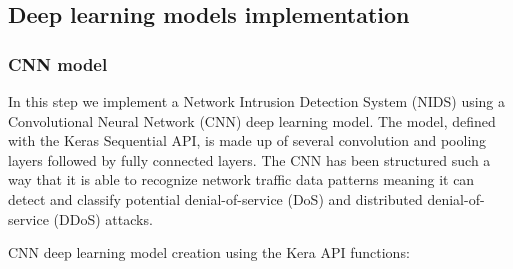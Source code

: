 




\subsection{Deep learning models implementation}




\subsubsection{CNN model}
In this step we implement a Network Intrusion Detection System (NIDS) using a Convolutional Neural Network (CNN) deep learning model. The model, defined with the Keras Sequential API, is made up of several convolution and pooling layers followed by fully connected layers. The CNN has been structured such a way that it is able to recognize network traffic data patterns meaning it can detect and classify potential denial-of-service (DoS) and distributed denial-of-service (DDoS) attacks.


CNN deep learning model creation using the Kera API functions:


